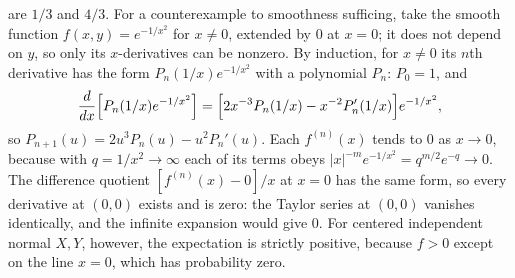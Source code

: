 are $1/3$ and $4/3$.
For a counterexample to smoothness sufficing, take the smooth function
$f(x,y)=e^{-1/x^2}$ for $x\ne0$, extended by 0 at $x=0$; it does not
depend on $y$, so only its $x$-derivatives can be nonzero. By induction,
for $x\ne0$ its $n$th derivative has the form $P_n(1/x)e^{-1/x^2}$ with
a polynomial $P_n$: $P_0=1$, and
\[
\frac d{dx}\Bigl[P_n(1/x)e^{-1/x^2}\Bigr]
=\Bigl[2x^{-3}P_n(1/x)-x^{-2}P_n'(1/x)\Bigr]e^{-1/x^2},
\]
so $P_{n+1}(u)=2u^3P_n(u)-u^2P_n'(u)$. Each $f^{(n)}(x)$ tends to 0 as
$x\to0$, because with $q=1/x^2\to\infty$ each of its terms obeys
$|x|^{-m}e^{-1/x^2}=q^{m/2}e^{-q}\to0$. The difference quotient
$[f^{(n)}(x)-0]/x$ at $x=0$ has the same form, so every derivative at
$(0,0)$ exists and is zero: the Taylor series at $(0,0)$ vanishes
identically, and the infinite expansion would give 0. For centered
independent normal $X,Y$, however, the expectation is strictly positive,
because $f>0$ except on the line $x=0$, which has probability zero.


